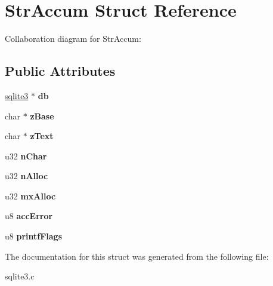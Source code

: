 \hypertarget{structStrAccum}{}\section{Str\+Accum Struct Reference}
\label{structStrAccum}


Collaboration diagram for Str\+Accum\+:
\subsection*{Public Attributes}
\begin{DoxyCompactItemize}
\item 
\hyperlink{structsqlite3}{sqlite3} $\ast$ {\bfseries db}\hypertarget{structStrAccum_ade44091c9a91671c9457b9e4a98a9a5d}{}\label{structStrAccum_ade44091c9a91671c9457b9e4a98a9a5d}

\item 
char $\ast$ {\bfseries z\+Base}\hypertarget{structStrAccum_a5797e2f288573ee98a4025f0f96fe50d}{}\label{structStrAccum_a5797e2f288573ee98a4025f0f96fe50d}

\item 
char $\ast$ {\bfseries z\+Text}\hypertarget{structStrAccum_ac45a51cb7b85da2ae9865eac21d416dc}{}\label{structStrAccum_ac45a51cb7b85da2ae9865eac21d416dc}

\item 
u32 {\bfseries n\+Char}\hypertarget{structStrAccum_a9ae2f859cd15934c7fd1ed2243782607}{}\label{structStrAccum_a9ae2f859cd15934c7fd1ed2243782607}

\item 
u32 {\bfseries n\+Alloc}\hypertarget{structStrAccum_a48d37540058f35811bd37c5ee56e0c93}{}\label{structStrAccum_a48d37540058f35811bd37c5ee56e0c93}

\item 
u32 {\bfseries mx\+Alloc}\hypertarget{structStrAccum_a113c466027421582120b873ba342529c}{}\label{structStrAccum_a113c466027421582120b873ba342529c}

\item 
u8 {\bfseries acc\+Error}\hypertarget{structStrAccum_a0ff9aa2eca1d5dc78692721e2a56dc1e}{}\label{structStrAccum_a0ff9aa2eca1d5dc78692721e2a56dc1e}

\item 
u8 {\bfseries printf\+Flags}\hypertarget{structStrAccum_a95038abba91f6ec1a74c9dfc4fec0df9}{}\label{structStrAccum_a95038abba91f6ec1a74c9dfc4fec0df9}

\end{DoxyCompactItemize}


The documentation for this struct was generated from the following file\+:\begin{DoxyCompactItemize}
\item 
sqlite3.\+c\end{DoxyCompactItemize}
